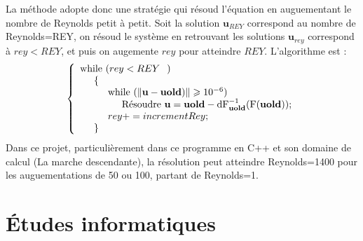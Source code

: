 \documentclass{book}
\begin{document}
La méthode adopte donc une stratégie qui résoud l'équation en auguementant le nombre de Reynolds petit à petit. Soit la solution $\textbf{u}_{REY}$ correspond au nombre de Reynolds=REY, on résoud le système en retrouvant les solutions $\textbf{u}_{rey}$ correspond à $rey < REY$, et puis on augemente $rey$ pour atteindre $REY$. L'algorithme est :
\[
\left\{
\begin{array}{lll}
\text{while } (rey<REY \hspace{0.25cm}) \\
\hspace{0.5cm} \{ \\
\hspace{1cm}\text{while }(\| \textbf{u}-\textbf{uold})\| \geqslant 10^{-6})\\
\hspace{1.5cm}\text{Résoudre }\textbf{u}= \textbf{uold}-\text{dF}^{-1}_{\textbf{uold}}(\text{F}(\textbf{uold}));\\
\hspace{1cm}rey+=incrementRey; \\
\hspace{0.5cm} \} 
\end{array}
\right.
\]
Dans ce projet, particulièrement dans ce programme en C++ et son domaine de calcul (La marche descendante), la résolution peut atteindre Reynolds=1400 pour les auguementations de 50 ou 100, partant de Reynolds=1.
\chapter{Études informatiques}
\end{document}
